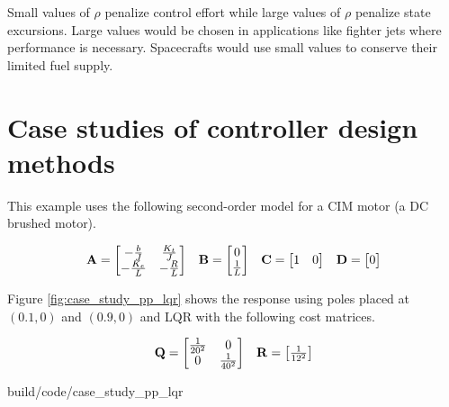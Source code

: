 Small values of $\rho$ penalize control effort while large values of $\rho$
penalize \gls{state} excursions. Large values would be chosen in applications
like fighter jets where performance is necessary. Spacecrafts would use small
values to conserve their limited fuel supply.

\section{Case studies of controller design methods}

This example uses the following second-order model for a CIM motor (a DC brushed
motor).

\begin{align*}
  \begin{array}{cccc}
    \mathbf{A} = \begin{bmatrix}
      -\frac{b}{J} & \frac{K_t}{J} \\
      -\frac{K_e}{L} & -\frac{R}{L}
    \end{bmatrix} &
    \mathbf{B} = \begin{bmatrix}
      0 \\
      \frac{1}{L}
    \end{bmatrix} &
    \mathbf{C} = \begin{bmatrix}
      1 & 0
    \end{bmatrix} &
    \mathbf{D} = \begin{bmatrix}
      0
    \end{bmatrix}
  \end{array}
\end{align*}

Figure \ref{fig:case_study_pp_lqr} shows the response using poles placed at
$(0.1, 0)$ and $(0.9, 0)$ and LQR with the following cost matrices.

\begin{align*}
  \begin{array}{cc}
    \mathbf{Q} = \begin{bmatrix}
      \frac{1}{20^2} & 0 \\
      0 & \frac{1}{40^2}
    \end{bmatrix} &
    \mathbf{R} = \begin{bmatrix}
      \frac{1}{12^2}
    \end{bmatrix}
  \end{array}
\end{align*}

\begin{svg}{build/code/case_study_pp_lqr}
  \caption{Second-order CIM motor response with pole placement and LQR}
  \label{fig:case_study_pp_lqr}
\end{svg}

